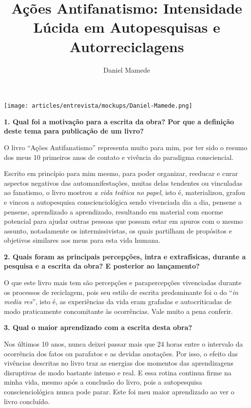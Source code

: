 \documentclass{gescons}
\author{Daniel Mamede}
\title{Ações Antifanatismo: Intensidade Lúcida em Autopesquisas e Autorreciclagens}
\begin{document}
    \makeentrevistatitle

    \begin{multicols}{2}

\begin{center}
    \texttt{[image: articles/entrevista/mockups/Daniel-Mamede.png]}
\end{center}


\textbf{1. Qual foi a motivação para a escrita da obra? Por que a definição deste tema para publicação de um livro?}

O livro “Ações Antifanatismo” representa muito para mim, por ter sido o resumo dos meus 10 primeiros anos de contato e vivência do paradigma consciencial. 

Escrito em princípio para mim mesmo, para poder organizar, reeducar e curar aspectos negativos das automanifestações, muitas delas tendentes ou vinculadas ao fanatismo, o livro mostrou \textit{a vida teática no papel,} isto é, materializou, grafou e vincou a autopesquisa conscienciológica sendo vivenciada dia a dia, pensene a pensene, aprendizado a aprendizado, resultando em material com enorme potencial para ajudar outras pessoas que possam estar em apuros com o mesmo assunto, notadamente os intermissivistas, os quais partilham de propósitos e objetivos similares aos meus para esta vida humana.



\textbf{2. Quais foram as principais percepções, intra e extrafísicas, durante a pesquisa e a escrita da obra? E posterior ao lançamento?}

O que este livro mais tem são percepções e parapercepções vivenciadas durante os processos de reciclagem, pois seu estilo de escrita predominante foi o do “\textit{in media res}”, isto é, as experiências da vida eram grafadas e autocriticadas de modo praticamente concomitante às ocorrências. Vale muito a pena conferir. 


\textbf{3.       Qual o maior aprendizado com a escrita desta obra?}

Nos últimos 10 anos, nunca deixei passar mais que 24 horas entre o intervalo da ocorrência dos fatos ou parafatos e as devidas anotações. Por isso, o efeito das vivências descritas no livro traz as energias dos momentos das aprendizagens disruptivas de modo bastante intenso e real. E essa rotina continua firme na minha vida, mesmo após a conclusão do livro, pois a autopesquisa conscienciológica nunca pode parar. Este foi meu maior aprendizado ao ver o livro concluído.


\end{multicols}
\end{document}
